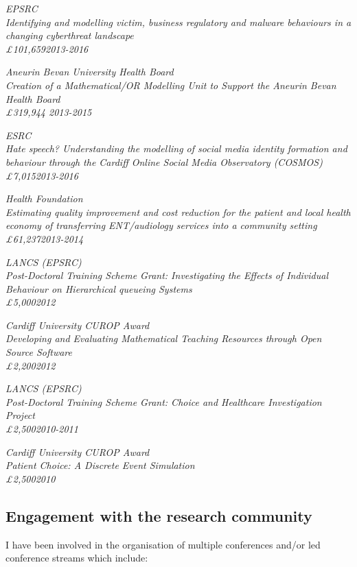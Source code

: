 \documentclass{article}
\begin{document}
\sl{EPSRC}\\
Identifying and modelling victim, business regulatory and malware behaviours in a changing cyberthreat landscape\\
\pounds101,659\hfill{2013-2016}


\sl{Aneurin Bevan University Health Board}\\
Creation of a Mathematical/OR Modelling Unit to Support the Aneurin Bevan Health Board\\
\pounds319,944 \hfill{2013-2015}


\sl{ESRC}\\
Hate speech? Understanding the modelling of social media identity formation and behaviour through the Cardiff Online Social Media Observatory (COSMOS)\\
\pounds7,015\hfill{2013-2016}


\sl{Health Foundation}\\
Estimating quality improvement and cost reduction for the patient and local health economy of transferring ENT/audiology services into a community setting\\
\pounds61,237\hfill{2013-2014}


\sl{LANCS (EPSRC)}\\
Post-Doctoral Training Scheme Grant: Investigating the Effects of Individual Behaviour on Hierarchical queueing Systems\\
\pounds5,000\hfill{2012}


\sl{Cardiff University CUROP Award}\\
Developing and Evaluating Mathematical Teaching Resources through Open Source Software\\
\pounds2,200\hfill{2012}

\sl{LANCS (EPSRC)}\\
Post-Doctoral Training Scheme Grant: Choice and Healthcare Investigation Project\\
\pounds2,500\hfill{2010-2011}

\sl{Cardiff University CUROP Award}\\
Patient Choice: A Discrete Event Simulation\\
\pounds2,500\hfill{2010}

\subsection{Engagement with the research community}

I have been involved in the organisation of multiple conferences and/or led conference streams which include:
\end{document}
